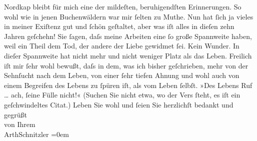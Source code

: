 \begin{ledgroupsized}[t]{13cm}
{{{                  Nordkap}}}\label{K_L01590_2h} bleibt für mich eine der mildeſten,
               beruhigendſten Erinnerungen. So wohl wie in jenen Buchenwäldern war mir ſelten zu
               Muthe. Nun hat ſich ja vieles in meiner Exiſtenz gut und ſchön geſtaltet, aber was
               iſt alles in dieſen zehn Jahren geſchehn! Sie ſagen, daſs meine Arbeiten eine ſo
               große Spannweite haben, weil ein Theil dem Tod, der andere der Liebe gewidmet {\pb}ſei. Kein Wunder. In dieſer Spannweite hat nicht
               mehr und nicht weniger Platz als das Leben. Freilich iſt mir ſehr wohl bewußt, daſs
               in dem, was ich bisher geſchrieben, mehr von der Sehnſucht nach dem Leben, von einer
               ſehr tiefen Ahnung und wohl auch von einem Begreifen des Lebens zu ſpüren iſt, als
               vom Leben ſelbſt. »Des Lebens Ruf {\dots} ach, ſeine Fülle
               nicht!« (Suchen Sie nicht etwa, wo der Vers {\pb}ſteht, es iſt ein geſchwindeltes Citat.)\pend
           \pstart
           Leben Sie wohl und ſeien Sie herzlichſt bedankt und gegrüßt{\\[\baselineskip]}von Ihrem{\\[\baselineskip]}\spacefill\mbox{ArthSchnitzler}\pend
           \leftskip=0em{}\endnumbering{}\end{ledgroupsized}  \newcommand{\dateiname}{L01590}\newcommand{\titel}{Arthur Schnitzler an Georg Brandes, 13. 3. 1906}\newcommand{\editorInnen}{Martin Anton Müller und Gerd-Hermann Susen}
      